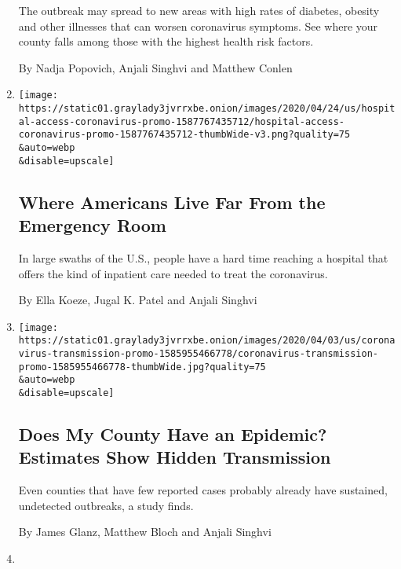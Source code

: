 \begin{enumerate}
  The outbreak may spread to new areas with high rates of diabetes,
  obesity and other illnesses that can worsen coronavirus symptoms. See
  where your county falls among those with the highest health risk
  factors.

  By Nadja Popovich, Anjali Singhvi and Matthew Conlen
\item
  \href{/interactive/2020/04/26/us/us-hospital-access-coronavirus.html}{}

  \texttt{[image: https://static01.graylady3jvrrxbe.onion/images/2020/04/24/us/hospital-access-coronavirus-promo-1587767435712/hospital-access-coronavirus-promo-1587767435712-thumbWide-v3.png?quality=75\\\&auto=webp\\\&disable=upscale]}

  \hypertarget{where-americans-live-far-from-the-emergency-room}{%
  \subsection{Where Americans Live Far From the Emergency
  Room}\label{where-americans-live-far-from-the-emergency-room}}

  In large swaths of the U.S., people have a hard time reaching a
  hospital that offers the kind of inpatient care needed to treat the
  coronavirus.

  By Ella Koeze, Jugal K. Patel and Anjali Singhvi
\item
  \href{/interactive/2020/04/03/us/coronavirus-county-epidemics.html}{}

  \texttt{[image: https://static01.graylady3jvrrxbe.onion/images/2020/04/03/us/coronavirus-transmission-promo-1585955466778/coronavirus-transmission-promo-1585955466778-thumbWide.jpg?quality=75\\\&auto=webp\\\&disable=upscale]}

  \hypertarget{does-my-county-have-an-epidemic-estimates-show-hidden-transmission}{%
  \subsection{Does My County Have an Epidemic? Estimates Show Hidden
  Transmission}\label{does-my-county-have-an-epidemic-estimates-show-hidden-transmission}}

  Even counties that have few reported cases probably already have
  sustained, undetected outbreaks, a study finds.

  By James Glanz, Matthew Bloch and Anjali Singhvi
\item
  \href{/interactive/2020/04/01/nyregion/nyc-coronavirus-cases-map.html}{}


\end{enumerate}
